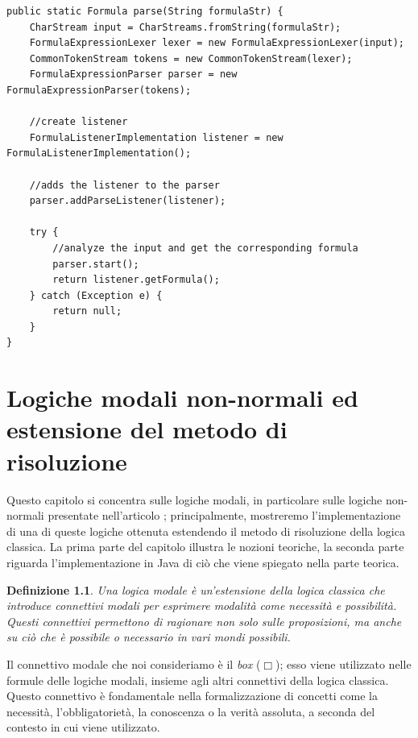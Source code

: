 \documentclass[a4paper,12pt]{report}
\newtheorem{definition}{Definizione}[section]
\begin{document}
\begin{minipage}{\linewidth}
    \begin{lstlisting}[caption={Metodo \texttt{parse} della classe \texttt{ParseFormula}}, label={parse}]
public static Formula parse(String formulaStr) {
    CharStream input = CharStreams.fromString(formulaStr);
    FormulaExpressionLexer lexer = new FormulaExpressionLexer(input);
    CommonTokenStream tokens = new CommonTokenStream(lexer);
    FormulaExpressionParser parser = new FormulaExpressionParser(tokens);

    //create listener
    FormulaListenerImplementation listener = new FormulaListenerImplementation();

    //adds the listener to the parser
    parser.addParseListener(listener);

    try {
        //analyze the input and get the corresponding formula
        parser.start();
        return listener.getFormula();
    } catch (Exception e) {
        return null;
    }
}
    \end{lstlisting}
\end{minipage}


% 
% 
\chapter{Logiche modali non-normali ed estensione del metodo di risoluzione}
\label{modal}
Questo capitolo si concentra sulle logiche modali, in particolare sulle logiche non-normali presentate nell'articolo \cite{Articolo_resolution}; principalmente, mostreremo l'implementazione di una di queste logiche ottenuta estendendo il metodo di risoluzione della logica classica. La prima parte del capitolo illustra le nozioni teoriche, la seconda parte riguarda l'implementazione in Java di ciò che viene spiegato nella parte teorica. 

\begin{definition}
    Una logica modale è un'estensione della logica classica che introduce connettivi modali per esprimere modalità come necessità e possibilità. Questi connettivi permettono di ragionare non solo sulle proposizioni, ma anche su ciò che è possibile o necessario in vari mondi possibili.
\end{definition}
Il connettivo modale che noi consideriamo è il \emph{box} ($\Box$); esso viene utilizzato nelle formule delle logiche modali, insieme agli altri connettivi della logica classica. Questo connettivo è fondamentale nella formalizzazione di concetti come la necessità, l'obbligatorietà, la conoscenza o la verità assoluta, a seconda del contesto in cui viene utilizzato.
\end{document}
